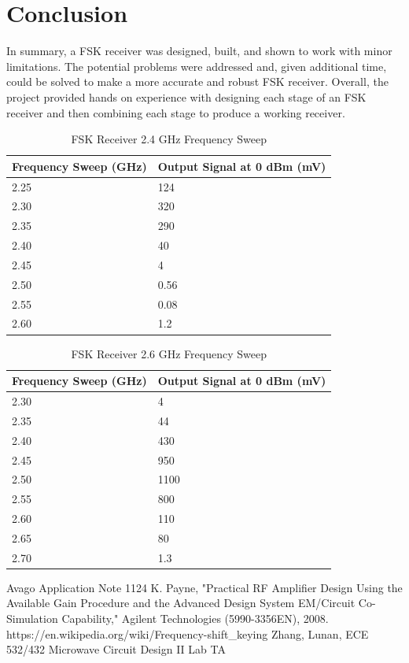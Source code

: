 \documentclass[conference]{IEEEtran}
\begin{document}
\section{Conclusion}
In summary, a FSK receiver was designed, built, and shown to work with minor limitations.  The potential problems were addressed and, given additional time, could be solved to make a more accurate and robust FSK receiver.  Overall, the project provided hands on experience with designing each stage of an FSK receiver and then combining each stage to produce a working receiver.
\begin{table}
\caption{FSK Receiver 2.4 GHz Frequency Sweep}
\begin{tabular}{|l|l|}
\hline
Frequency Sweep (GHz) & Output Signal at 0 dBm (mV) \\\hline
2.25 & 124 \\\hline
2.30 & 320 \\\hline
2.35 & 290 \\\hline
2.40 & 40 \\\hline
2.45 & 4 \\\hline
2.50 & 0.56 \\\hline
2.55 & 0.08 \\\hline
2.60 & 1.2 \\\hline
\end{tabular}
\label{tab:fsk24}
\end{table}
 
\begin{table}
\caption{FSK Receiver 2.6 GHz Frequency Sweep}
\begin{tabular}{|l|l|}
\hline
Frequency Sweep (GHz) & Output Signal at 0 dBm (mV) \\ \hline
2.30 & 4 \\ \hline
2.35 & 44 \\ \hline
2.40 & 430 \\ \hline
2.45 & 950 \\ \hline
2.50 & 1100 \\ \hline
2.55 & 800 \\\hline
2.60 & 110 \\ \hline
2.65 & 80 \\\hline
2.70 & 1.3 \\\hline
\end{tabular}
\label{tab:fsk26}
\end{table}

\begin{thebibliography}{1}
Avago Application Note 1124
K. Payne, "Practical RF Amplifier Design Using the Available Gain Procedure and the Advanced Design System EM/Circuit Co-Simulation Capability," Agilent Technologies (5990-3356EN), 2008.
https://en.wikipedia.org/wiki/Frequency-shift\_keying
Zhang, Lunan, ECE 532/432 Microwave Circuit Design II Lab TA
\end{thebibliography}
\end{document}
